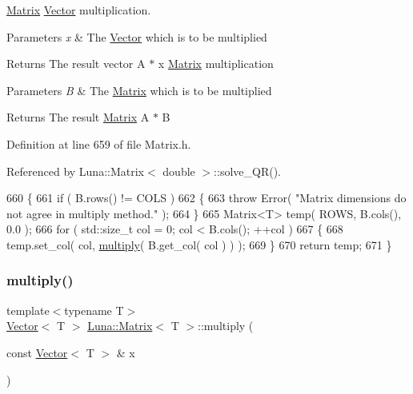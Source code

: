 \hyperlink{classLuna_1_1Matrix}{Matrix} \hyperlink{classLuna_1_1Vector}{Vector} multiplication. 


\begin{DoxyParams}{Parameters}
{\em x} & The \hyperlink{classLuna_1_1Vector}{Vector} which is to be multiplied \\
\hline
\end{DoxyParams}
\begin{DoxyReturn}{Returns}
The result vector A $\ast$ x \hyperlink{classLuna_1_1Matrix}{Matrix} multiplication 
\end{DoxyReturn}

\begin{DoxyParams}{Parameters}
{\em B} & The \hyperlink{classLuna_1_1Matrix}{Matrix} which is to be multiplied \\
\hline
\end{DoxyParams}
\begin{DoxyReturn}{Returns}
The result \hyperlink{classLuna_1_1Matrix}{Matrix} A $\ast$ B 
\end{DoxyReturn}


Definition at line 659 of file Matrix.\+h.



Referenced by Luna\+::\+Matrix$<$ double $>$\+::solve\+\_\+\+Q\+R().


\begin{DoxyCode}
660   \{
661     \textcolor{keywordflow}{if} ( B.rows() != COLS )
662     \{
663       \textcolor{keywordflow}{throw} Error( \textcolor{stringliteral}{"Matrix dimensions do not agree in multiply method."} );
664     \}
665     Matrix<T> temp( ROWS, B.cols(), 0.0 );
666     \textcolor{keywordflow}{for} ( std::size\_t col = 0; col < B.cols(); ++col )
667     \{
668       temp.set\_col( col, \hyperlink{classLuna_1_1Matrix_a0a55d0f67f6fdfc33f13e0d89225617d}{multiply}( B.get\_col( col ) ) );
669     \}
670     \textcolor{keywordflow}{return} temp;
671   \}
\end{DoxyCode}
\mbox{\label{classLuna_1_1Matrix_aa7169bd89ea8e76cd5a38e3d2d5b2879}} 
\subsubsection{\texorpdfstring{multiply()}{multiply()}\hspace{0.1cm}{\footnotesize\ttfamily [2/2]}}
{\footnotesize\ttfamily template$<$typename T$>$ \\
\hyperlink{classLuna_1_1Vector}{Vector}$<$ T $>$ \hyperlink{classLuna_1_1Matrix}{Luna\+::\+Matrix}$<$ T $>$\+::multiply (\begin{DoxyParamCaption}\item[{const \hyperlink{classLuna_1_1Vector}{Vector}$<$ T $>$ \&}]{x }\end{DoxyParamCaption})\hspace{0.3cm}{\ttfamily [inline]}}




